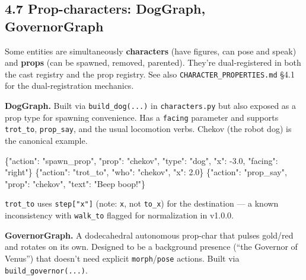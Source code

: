 \documentclass[
  12pt,
  letterpaper,
]{book}
\newenvironment{Shaded}{}{}
\newcommand{\DataTypeTok}[1]{\textcolor[rgb]{0.56,0.13,0.00}{#1}}
\newcommand{\FloatTok}[1]{\textcolor[rgb]{0.25,0.63,0.44}{#1}}
\newcommand{\FunctionTok}[1]{\textcolor[rgb]{0.02,0.16,0.49}{#1}}
\newcommand{\StringTok}[1]{\textcolor[rgb]{0.25,0.44,0.63}{#1}}
\begin{document}
\subsection{4.7 Prop-characters: DogGraph,
GovernorGraph}\label{prop-characters-doggraph-governorgraph}

Some entities are simultaneously \textbf{characters} (have figures, can
pose and speak) and \textbf{props} (can be spawned, removed, parented).
They're dual-registered in both the cast registry and the prop registry.
See also \texttt{CHARACTER\_PROPERTIES.md} §4.1 for the
dual-registration mechanics.

\textbf{DogGraph.} Built via \texttt{build\_dog(...)} in
\texttt{characters.py} but also exposed as a prop type for spawning
convenience. Has a \texttt{facing} parameter and supports
\texttt{trot\_to}, \texttt{prop\_say}, and the usual locomotion verbs.
Chekov (the robot dog) is the canonical example.

\begin{Shaded}
\begin{Highlighting}[]
\FunctionTok{\{}\DataTypeTok{"action"}\FunctionTok{:} \StringTok{"spawn\_prop"}\FunctionTok{,} \DataTypeTok{"prop"}\FunctionTok{:} \StringTok{"chekov"}\FunctionTok{,}
 \DataTypeTok{"type"}\FunctionTok{:} \StringTok{"dog"}\FunctionTok{,} \DataTypeTok{"x"}\FunctionTok{:} \FloatTok{{-}3.0}\FunctionTok{,} \DataTypeTok{"facing"}\FunctionTok{:} \StringTok{"right"}\FunctionTok{\}}
\FunctionTok{\{}\DataTypeTok{"action"}\FunctionTok{:} \StringTok{"trot\_to"}\FunctionTok{,} \DataTypeTok{"who"}\FunctionTok{:} \StringTok{"chekov"}\FunctionTok{,} \DataTypeTok{"x"}\FunctionTok{:} \FloatTok{2.0}\FunctionTok{\}}
\FunctionTok{\{}\DataTypeTok{"action"}\FunctionTok{:} \StringTok{"prop\_say"}\FunctionTok{,} \DataTypeTok{"prop"}\FunctionTok{:} \StringTok{"chekov"}\FunctionTok{,} \DataTypeTok{"text"}\FunctionTok{:} \StringTok{"Beep boop!"}\FunctionTok{\}}
\end{Highlighting}
\end{Shaded}

\texttt{trot\_to} uses \texttt{step{[}"x"{]}} (note: \texttt{x}, not
\texttt{to\_x}) for the destination --- a known inconsistency with
\texttt{walk\_to} flagged for normalization in v1.0.0.

\textbf{GovernorGraph.} A dodecahedral autonomous prop-char that pulses
gold/red and rotates on its own. Designed to be a background presence
(``the Governor of Venus'') that doesn't need explicit
\texttt{morph}/\texttt{pose} actions. Built via
\texttt{build\_governor(...)}.
\end{document}
